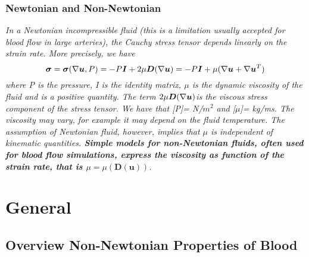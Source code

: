 \documentclass[11pt,letterpaper]{article}
\begin{document}
\subsubsection*{Newtonian and Non-Newtonian}
\textit{ In a Newtonian incompressible fluid (this is a limitation usually accepted for blood flow in large arteries), the Cauchy stress tensor depends
linearly on the strain rate. More precisely, we have \begin{equation}
    \bm{\sigma} = \bm{\sigma}(\nabla\bm{u},P)= -P\bm{I} +2\mu\bm{D}(\nabla\bm{u})= -P\bm{I} + \mu(\nabla\bm{u}+\nabla\bm{u}^T)
\end{equation}
where P is the pressure, I is the identity matrix, $\mu$ is the dynamic viscosity of the fluid and is a positive quantity. The term $2\mu\bm{D}(\nabla\bm{u})$is the viscous stress component of the stress tensor. We
have that [P]= N/$m^2$ and [$\mu$]= kg/ms. The viscosity may vary, for example it may depend on the fluid temperature. The assumption of Newtonian fluid, however, implies that $\mu$ is independent of kinematic quantities. \textbf{Simple models for non-Newtonian fluids, often used for blood flow simulations, express the viscosity as function of the strain rate, that is $\mu = \mu(\bm{D}(\bm{u}))$}. }











\newpage
\section{General}

\subsection*{Overview Non-Newtonian Properties of Blood
}
\end{document}
